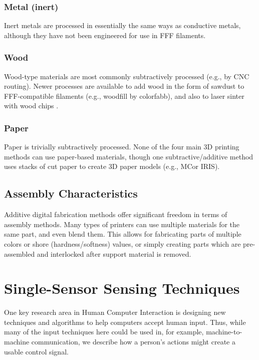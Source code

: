\subsubsection{Metal (inert)}

Inert metals are processed in essentially the same ways as conductive metals, although they have not been engineered for use in FFF filaments.

\subsubsection{Wood}

Wood-type materials are most commonly subtractively processed (e.g., by CNC routing). Newer processes are available to add wood in the form of sawdust to FFF-compatible filaments (e.g., woodfill by colorfabb), and also to laser sinter with wood chips \cite{materialise-wood}.

\subsubsection{Paper}

Paper is trivially subtractively processed. None of the four main 3D printing methods can use paper-based materials, though one subtractive/additive method uses stacks of cut paper to create 3D paper models (e.g., MCor IRIS).

\subsection{Assembly Characteristics}


Additive digital fabrication methods offer significant freedom in terms of assembly methods. Many types of printers can use multiple materials for the same part, and even blend them. This allows for fabricating parts of multiple colors or shore (hardness/softness) values, or simply creating parts which are pre-assembled and interlocked after support material is removed. 

\section{Single-Sensor Sensing Techniques}

One key research area in Human Computer Interaction is designing new techniques and algorithms to help computers accept human input. Thus, while many of the input techniques here could be used in, for example, machine-to-machine communication, we describe how a person's actions might create a usable control signal.

